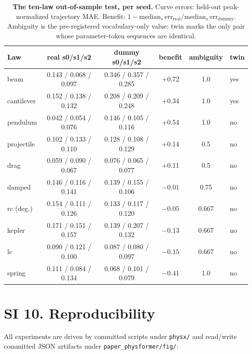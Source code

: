 \documentclass[11pt,a4paper]{article}
\begin{document}
\begin{table}[h]
\centering\small
\caption{\textbf{The ten-law out-of-sample test, per seed.}
Curve errors: held-out peak-normalized trajectory MAE. Benefit:
$1 - \mathrm{median}_{s}\,\mathrm{err}_{\mathrm{real}} /
\mathrm{median}_{s}\,\mathrm{err}_{\mathrm{dummy}}$. Ambiguity is the
pre-registered vocabulary-only value; twin marks the only pair whose
parameter-token sequences are identical.}
\label{tab:oos}
\begin{tabular}{lccccl}
\toprule
Law & real s0/s1/s2 & dummy s0/s1/s2 & benefit & ambiguity & twin \\
\midrule
beam       & 0.143 / 0.068 / 0.097 & 0.346 / 0.357 / 0.285 & +0.72 & 1.0 & yes \\
cantilever & 0.152 / 0.138 / 0.132 & 0.208 / 0.209 / 0.248 & +0.34 & 1.0 & yes \\
pendulum   & 0.042 / 0.054 / 0.076 & 0.146 / 0.105 / 0.116 & +0.54 & 1.0 & no \\
projectile & 0.102 / 0.133 / 0.110 & 0.128 / 0.108 / 0.129 & +0.14 & 0.5 & no \\
drag       & 0.059 / 0.090 / 0.067 & 0.076 / 0.065 / 0.077 & +0.11 & 0.5 & no \\
damped     & 0.146 / 0.116 / 0.141 & 0.139 / 0.155 / 0.106 & $-0.01$ & 0.75 & no \\
rc (deg.)  & 0.154 / 0.111 / 0.126 & 0.133 / 0.117 / 0.120 & $-0.05$ & 0.667 & no \\
kepler     & 0.171 / 0.151 / 0.157 & 0.139 / 0.207 / 0.132 & $-0.13$ & 0.667 & no \\
lc         & 0.090 / 0.121 / 0.100 & 0.087 / 0.080 / 0.097 & $-0.15$ & 0.667 & no \\
spring     & 0.111 / 0.084 / 0.134 & 0.068 / 0.101 / 0.079 & $-0.41$ & 1.0 & no \\
\bottomrule
\end{tabular}
\end{table}

\section*{SI 10. Reproducibility}
\label{si:repro}

All experiments are driven by committed scripts under \texttt{physx/} and
read/write committed JSON artifacts under \texttt{paper\_physformer/fig/}:
\end{document}
